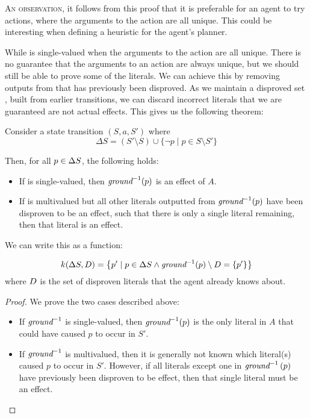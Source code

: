 \documentclass[../Master.tex]{subfiles}
\begin{document}
\textsc{An observation}, it follows from this proof that it is preferable for an agent to try actions, where the arguments to the action are all unique. This could be interesting when defining a heuristic for the agent's planner. 

While \invground is single-valued when the arguments to the action are all unique. 
There is no guarantee that the arguments to an action are always unique, but we should still be able to prove some of the literals.
We can achieve this by removing outputs from \invground that has previously been disproved.
As we maintain a disproved set \Dsp, built from earlier transitions, we can discard incorrect literals that we are guaranteed are not actual effects. 
This gives us the following theorem: 

\begin{theorem}\label{thm:nca:prove-effects} Consider a state transition $(S,a,S')$ where
	\begin{equation*}
	\Delta S = \left(S' \setminus S\right) \cup \{\neg p \mid  p \in S \setminus S' \}
	\end{equation*}
	
	Then, for all $p \in \Delta S$, the following holds:
	
    \begin{itemize}
        \item If \invground is single-valued, then $\textit{ground} ^{-1}(p)$ is an effect of $A$.
        \item If \invground is multivalued but all other literals outputted from $\textit{ground} ^{-1}(p)$ have been disproven to be an effect, 
        such that there is only a single literal remaining, then that literal is an effect.
    \end{itemize}

	We can write this as a function:
	
	\begin{equation*}
	k(\Delta S,D) = 
	\left\{
		p' \mid 
				p \in \Delta S \land 
				\textit{ground} ^{-1}(p) \setminus D = \{p'\}
		\right\}
	\end{equation*}
	where $D$ is the set of disproven literals that the agent already knows about.
\end{theorem}
	
\begin{proof}
    We prove the two cases described above:
    \begin{itemize}
        \item If $\textit{ground} ^{-1}$ is single-valued, then $\textit{ground} ^{-1} (p)$ is the only literal in $A$ that could have caused $p$ to occur in $S'$.
        \item If $\textit{ground} ^{-1}$ is multivalued, then it is generally not known which literal(s) caused $p$ to occur in $S'$. However, if all literals except one in $\textit{ground} ^{-1}\left( p \right)$ have previously been disproven to be effect, then that single literal must be an effect. 
    \end{itemize}
\end{proof}
\end{document}
